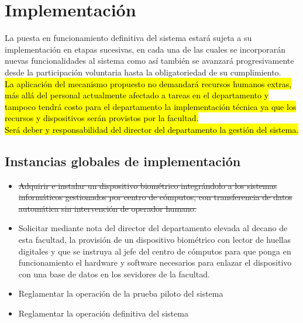 \documentclass[a4paper, 11pt]{article} %
\begin{document}
\section*{Implementación}
La puesta en funcionamiento definitiva del sistema estará sujeta a su implementación en etapas sucesivas, en cada una de las cuales se incorporarán nuevas funcionalidades al sistema como así también se avanzará progresivamente desde la participación voluntaria hasta la obligatoriedad de su cumplimiento.\\
\hl{La aplicación del mecanismo propuesto no demandará recursos humanos extras, más allá del personal actualmente afectado a tareas en el departamento y tampoco tendrá costo para el departamento la implementación técnica ya que los recursos y dispositivos serán provistos por la facultad.}\\
\hl{Será deber y responsabilidad del director del departamento la gestión del sistema.}\\
\subsection*{Instancias globales de implementación}
\begin{itemize}
	\item \st{Adquirir e instalar un dispositivo biométrico integrándolo a los sistemas informáticos gestionados por centro de cómputos, con transferencia de datos automática sin intervención de operador humano.}
	\item Solicitar mediante nota del director del departamento elevada al decano de esta facultad, la provisión de un dispositivo biométrico con lector de huellas digitales y que se instruya al jefe del centro de cómputos para que ponga en funcionamiento el hardware y software necesarios para enlazar el dispositivo con una base de datos en los sevidores de la facultad.
	\item Reglamentar la operación de la prueba piloto del sistema
	\item Reglamentar la operación definitiva del sistema
\end{itemize}
\end{document}

